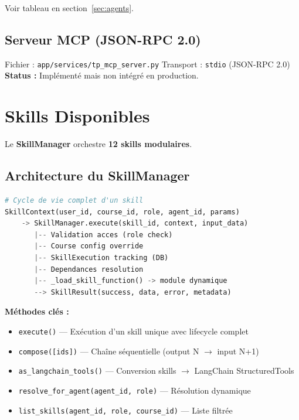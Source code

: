 \documentclass[12pt,a4paper]{article}
\begin{document}
Voir tableau en section~\ref{sec:agents}.

\subsection{Serveur MCP (JSON-RPC 2.0)}

Fichier : \texttt{app/services/tp\_mcp\_server.py}
Transport : \texttt{stdio} (JSON-RPC 2.0)
\textbf{Status :} Implémenté mais \textcolor{espritred}{non intégré en production}.

\section{Skills Disponibles}
\label{sec:skills}

Le \textbf{SkillManager} orchestre \textbf{12 skills modulaires}.

\subsection{Architecture du SkillManager}

\begin{lstlisting}[language=Python]
# Cycle de vie complet d'un skill
SkillContext(user_id, course_id, role, agent_id, params)
    -> SkillManager.execute(skill_id, context, input_data)
       |-- Validation acces (role check)
       |-- Course config override
       |-- SkillExecution tracking (DB)
       |-- Dependances resolution
       |-- _load_skill_function() -> module dynamique
       --> SkillResult(success, data, error, metadata)
\end{lstlisting}

\textbf{Méthodes clés :}
\begin{itemize}[noitemsep]
  \item \texttt{execute()} --- Exécution d'un skill unique avec lifecycle complet
  \item \texttt{compose([ids])} --- Chaîne séquentielle (output N $\to$ input N+1)
  \item \texttt{as\_langchain\_tools()} --- Conversion skills $\to$ LangChain StructuredTools
  \item \texttt{resolve\_for\_agent(agent\_id, role)} --- Résolution dynamique
  \item \texttt{list\_skills(agent\_id, role, course\_id)} --- Liste filtrée
\end{itemize}
\end{document}
